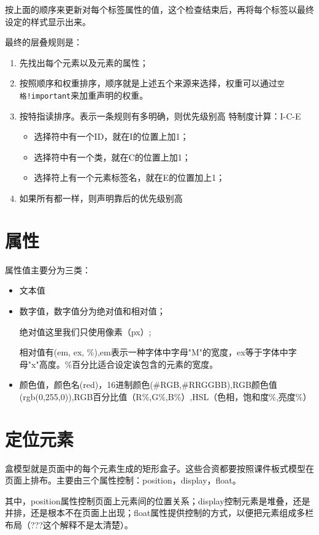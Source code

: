 按上面的顺序来更新对每个标签属性的值，这个检查结束后，再将每个标签以最终设定的样式显示出来。


最终的层叠规则是：
\begin{enumerate}
\item 先找出每个元素以及元素的属性；
\item 按照顺序和权重排序，顺序就是上述五个来源来选择，权重可以通过\lstinline$空格!important$来加重声明的权重。
\item 按特指读排序。表示一条规则有多明确，则优先级别高
特制度计算：I-C-E
\begin{itemize}
\item 选择符中有一个ID，就在I的位置上加1；
\item 选择符中有一个类，就在C的位置上加1；
\item 选择符上有一个元素标签名，就在E的位置加上1；
\end{itemize}
\item 如果所有都一样，则声明靠后的优先级别高
\end{enumerate}


\section{属性}

属性值主要分为三类：

\begin{itemize}
\item 文本值
\item 数字值，数字值分为绝对值和相对值；

绝对值这里我们只使用像素（px）;

相对值有(em, ex, \%),em表示一种字体中字母"M"的宽度，ex等于字体中字母"x"高度。\%百分比适合设定诶包含的元素的宽度。

\item 颜色值，颜色名(red)，16进制颜色(\#RGB,\#RRGGBB),RGB颜色值(rgb(0,255,0)),RGB百分比值（R\%,G\%,B\%）,HSL（色相，饱和度\%,亮度\%）
\end{itemize}


\section{定位元素}

盒模型就是页面中的每个元素生成的矩形盒子。这些合资都要按照课件板式模型在页面上排布。主要由三个属性控制：position，display，float。

其中，position属性控制页面上元素间的位置关系；display控制元素是堆叠，还是并排，还是根本不在页面上出现；float属性提供控制的方式，以便把元素组成多栏布局（???这个解释不是太清楚）。

